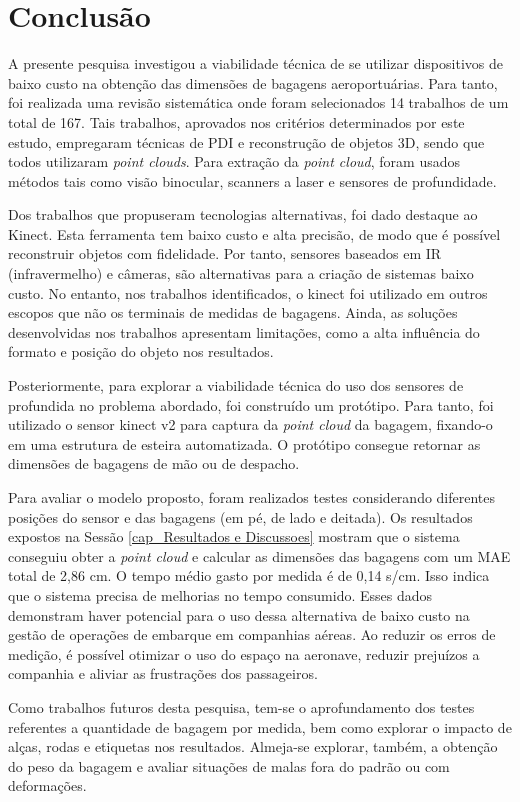 %
\chapter[Conclusão]{Conclusão}
\label{cap_conclusao}

    A presente pesquisa investigou a viabilidade técnica de se utilizar dispositivos de baixo custo na obtenção das dimensões de bagagens aeroportuárias. Para tanto, foi realizada uma revisão sistemática onde foram selecionados 14 trabalhos de um total de 167. Tais trabalhos, aprovados nos critérios determinados por este estudo, empregaram técnicas de PDI e reconstrução de objetos 3D, sendo que todos utilizaram \textit{point clouds}. Para extração da \textit{point cloud}, foram usados métodos tais como visão binocular, scanners a laser e sensores de profundidade. 
    
    Dos trabalhos que propuseram tecnologias alternativas, foi dado destaque ao Kinect. Esta ferramenta tem baixo custo e alta precisão, de modo que é possível reconstruir objetos com fidelidade. Por tanto, sensores baseados em IR (infravermelho) e câmeras, são alternativas para a criação de sistemas baixo custo. No entanto, nos trabalhos identificados, o kinect foi utilizado em outros escopos que não os terminais de medidas de bagagens. Ainda, as soluções desenvolvidas nos trabalhos apresentam limitações, como a alta influência do formato e posição do objeto nos resultados.
    
    Posteriormente, para explorar a viabilidade técnica do uso dos sensores de profundida no problema abordado, foi construído um protótipo. Para tanto, foi utilizado o sensor kinect v2 para captura da \textit{point cloud} da bagagem, fixando-o em uma estrutura de esteira automatizada. O protótipo consegue retornar as dimensões de bagagens de mão ou de despacho. 
    
    Para avaliar o modelo proposto, foram realizados testes considerando diferentes posições do sensor e das bagagens (em pé, de lado e deitada). Os resultados expostos na Sessão \ref{cap_Resultados e Discussoes} mostram que o sistema conseguiu obter a \textit{point cloud} e calcular as dimensões das bagagens com um MAE total de 2,86 cm. O tempo médio gasto por medida é de 0,14 s/cm. Isso indica que o sistema precisa de melhorias no tempo consumido. Esses dados demonstram haver potencial para o uso dessa alternativa de baixo custo na gestão de operações de embarque em companhias aéreas. Ao reduzir os erros de medição, é possível otimizar o uso do espaço na aeronave, reduzir prejuízos a companhia e aliviar as frustrações dos passageiros.
    
    Como trabalhos futuros desta pesquisa, tem-se o aprofundamento dos testes referentes a quantidade de bagagem por medida, bem como explorar o impacto de alças, rodas e etiquetas nos resultados. Almeja-se explorar, também, a obtenção do peso da bagagem e avaliar situações de malas fora do padrão ou com deformações.

    